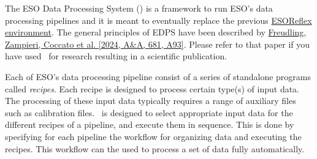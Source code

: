 The ESO Data Processing System (\edps) is a framework to run ESO’s
data processing pipelines and it is meant to eventually replace the
previous \href{https://www.eso.org/sci/software/esoreflex/}{ESOReflex
  environment}. The general principles of EDPS have been described by
\href{https://www.aanda.org/articles/aa/full_html/2024/01/aa47651-23/aa47651-23.html}{Freudling,
  Zampieri, Coccato et al. [2024, A\&A, 681, A93]}. Please refer to
that paper if you have used \edps\ for research resulting in a
scientific publication.

Each of ESO’s data processing pipeline consist of a series of
standalone programs called {\it recipes}. Each recipe is designed to
process certain type(s) of input data. The processing of these input
data typically requires a range of auxiliary files such as calibration
files. \edps\ is designed to select appropriate input data for the
different recipes of a pipeline, and execute them in sequence. This is
done by specifying for each pipeline the workflow for organizing data
and executing the recipes. This workflow can the used to process a set
of data fully automatically.

